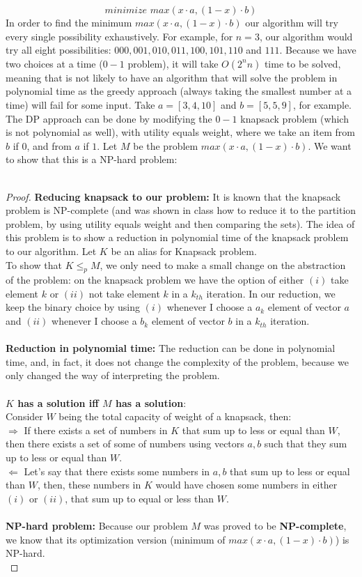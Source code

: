\documentclass{article}
\begin{document}
$$
\textit{minimize } max(x \cdot a, (1-x) \cdot b)
$$
In order to find the minimum $max(x \cdot a, (1-x) \cdot b)$ our algorithm will try every single possibility exhaustively. For example, for $n = 3$, our algorithm would try all eight possibilities: $000, 001, 010, 011, 100, 101, 110$ and $111$. Because we have two choices at a time ($0-1$ problem), it will take $O(2^n n)$ time to be solved, meaning that is not likely to have an algorithm that will solve the problem in polynomial time as the greedy approach (always taking the smallest number at a time) will fail for some input. Take $a=[3, 4, 10]$ and $b=[5,5,9]$, for example. The DP approach can be done by modifying the $0-1$ knapsack problem (which is not polynomial as well), with utility equals weight, where we take an item from $b$ if $0$, and from $a$ if $1$. Let $M$ be the problem $max(x \cdot a, (1-x) \cdot b)$. We want to show that this is a NP-hard problem:
\\
\\
\begin{proof}
\textbf{Reducing knapsack to our problem:} It is known that the knapsack problem is NP-complete (and was shown in class how to reduce it to the partition problem, by using utility equals weight and then comparing the sets). The idea of this problem is to show a reduction in polynomial time of the knapsack problem to our algorithm. Let $K$ be an alias for Knapsack problem. 
\\
To show that $K \leq_{p} M$, we only need to make a small change on the abstraction of the problem: on the knapsack problem we have the option of either $(i)$ take element $k$ or $(ii)$ not take element $k$ in a $k_{th}$ iteration. In our reduction, we keep the binary choice by using $(i)$ whenever I choose a $a_k$ element of vector $a$ and $(ii)$ whenever I choose a $b_k$ element of vector $b$ in a $k_{th}$ iteration.
\\
\\
\textbf{Reduction in polynomial time:} The reduction can be done in polynomial time, and, in fact, it does not change the complexity of the problem, because we only changed the way of interpreting the problem.
\\
\\
\textbf{$K$ has a solution iff $M$ has a solution}:
\\
Consider $W$ being the total capacity of weight of a knapsack, then:
\\
$\Longrightarrow $ If there exists a set of numbers in $K$ that sum up to less or equal than $W$, then there exists a set of some of numbers using vectors $a, b$ such that they sum up to less or equal than $W$.
\\
$\Longleftarrow $ Let’s say that there exists some numbers in $a, b$ that sum up to less or equal than $W$, then, these numbers in $K$ would have chosen some numbers in either $(i)$ or $(ii)$, that sum up to equal or less than $W$.
\\
\\
\textbf{NP-hard problem:} Because our problem $M$ was proved to be \textbf{NP-complete}, we know that its optimization version (minimum of $max(x \cdot a, (1-x) \cdot b)$) is NP-hard.
\\
\end{proof}
\end{document}
